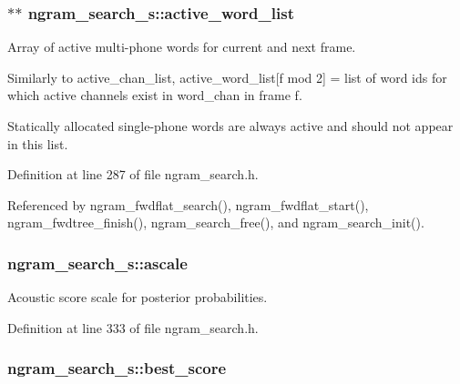 \subsubsection[{active\-\_\-word\-\_\-list}]{$\ast$$\ast$ {\bf ngram\-\_\-search\-\_\-s\-::active\-\_\-word\-\_\-list}}\label{structngram__search__s_a5056573bf95990cc28c97a56cd76ce9a}


\-Array of active multi-\/phone words for current and next frame. 

\-Similarly to active\-\_\-chan\-\_\-list, active\-\_\-word\-\_\-list[f mod 2] = list of word ids for which active channels exist in word\-\_\-chan in frame f.

\-Statically allocated single-\/phone words are always active and should not appear in this list. 

\-Definition at line 287 of file ngram\-\_\-search.\-h.



\-Referenced by ngram\-\_\-fwdflat\-\_\-search(), ngram\-\_\-fwdflat\-\_\-start(), ngram\-\_\-fwdtree\-\_\-finish(), ngram\-\_\-search\-\_\-free(), and ngram\-\_\-search\-\_\-init().

\subsubsection[{ascale}]{ {\bf ngram\-\_\-search\-\_\-s\-::ascale}}\label{structngram__search__s_a1e3d4b67e4b11c6c11ebe16552d53d2d}


\-Acoustic score scale for posterior probabilities. 



\-Definition at line 333 of file ngram\-\_\-search.\-h.

\subsubsection[{best\-\_\-score}]{ {\bf ngram\-\_\-search\-\_\-s\-::best\-\_\-score}}\label{structngram__search__s_a150d99157e2f37a6f0dbb4b02682d9c3}


